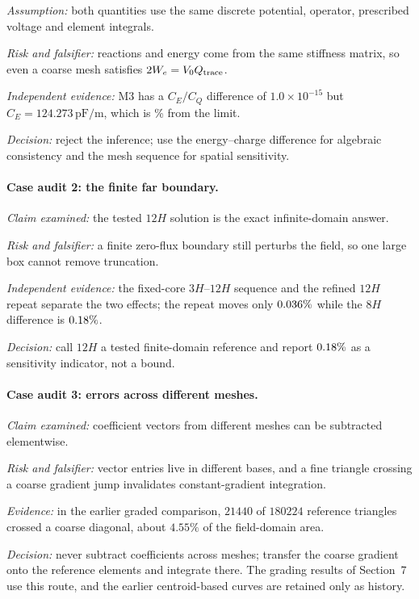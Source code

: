 \documentclass[11pt]{article}
\begin{document}
\noindent\textit{Assumption:} both quantities use the same discrete potential, operator,
prescribed voltage and element integrals.

\noindent\textit{Risk and falsifier:} reactions and energy come from the same stiffness
matrix, so even a coarse mesh satisfies $2W_e=V_0Q_{\rm trace}$.

\noindent\textit{Independent evidence:} M3 has a $C_E/C_Q$ difference of
$1.0\times10^{-15}$ but $C_E=124.273\,\mathrm{pF/m}$, which is \ErrThree\% from the limit.

\noindent\textit{Decision:} reject the inference; use the energy--charge difference for
algebraic consistency and the mesh sequence for spatial sensitivity.

\paragraph{Case audit 2: the finite far boundary.}
\noindent\textit{Claim examined:} the tested $12H$ solution is the exact infinite-domain
answer.

\noindent\textit{Risk and falsifier:} a finite zero-flux boundary still perturbs the field,
so one large box cannot remove truncation.

\noindent\textit{Independent evidence:} the fixed-core $3H$--$12H$ sequence and the refined
$12H$ repeat separate the two effects; the repeat moves only $0.036\%$ while the $8H$
difference is $0.18\%$.

\noindent\textit{Decision:} call $12H$ a tested finite-domain reference and report
$0.18\%$ as a sensitivity indicator, not a bound.

\paragraph{Case audit 3: errors across different meshes.}
\noindent\textit{Claim examined:} coefficient vectors from different meshes can be
subtracted elementwise.

\noindent\textit{Risk and falsifier:} vector entries live in different bases, and a fine
triangle crossing a coarse gradient jump invalidates constant-gradient integration.

\noindent\textit{Evidence:} in the earlier graded comparison, $21440$ of $180224$ reference
triangles crossed a coarse diagonal, about $4.55\%$ of the field-domain area.

\noindent\textit{Decision:} never subtract coefficients across meshes; transfer the coarse
gradient onto the reference elements and integrate there. The grading results of Section~7
use this route, and the earlier centroid-based curves are retained only as history.
\end{document}
